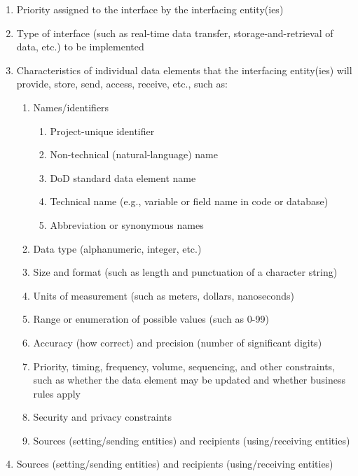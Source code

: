 \documentclass{fidata-report-template}
\begin{document}
\begin{enumerate}
\itemsep1pt\parskip0pt
\item
  Priority assigned to the interface by the interfacing entity(ies)
\item
  Type of interface (such as real-time data transfer,
  storage-and-retrieval of data, etc.) to be implemented
\item
  Characteristics of individual data elements that the interfacing
  entity(ies) will provide, store, send, access, receive, etc., such as:

  \begin{enumerate}
  \itemsep1pt\parskip0pt
  \item
    Names/identifiers

    \begin{enumerate}
    \itemsep1pt\parskip0pt
    \item
      Project-unique identifier
    \item
      Non-technical (natural-language) name
    \item
      DoD standard data element name
    \item
      Technical name (e.g., variable or field name in code or database)
    \item
      Abbreviation or synonymous names
    \end{enumerate}
  \item
    Data type (alphanumeric, integer, etc.)
  \item
    Size and format (such as length and punctuation of a character
    string)
  \item
    Units of measurement (such as meters, dollars, nanoseconds)
  \item
    Range or enumeration of possible values (such as 0-99)
  \item
    Accuracy (how correct) and precision (number of significant digits)
  \item
    Priority, timing, frequency, volume, sequencing, and other
    constraints, such as whether the data element may be updated and
    whether business rules apply
  \item
    Security and privacy constraints
  \item
    Sources (setting/sending entities) and recipients (using/receiving
    entities)
  \end{enumerate}
\item
  Sources (setting/sending entities) and recipients (using/receiving
  entities)


\end{enumerate}
\end{document}
